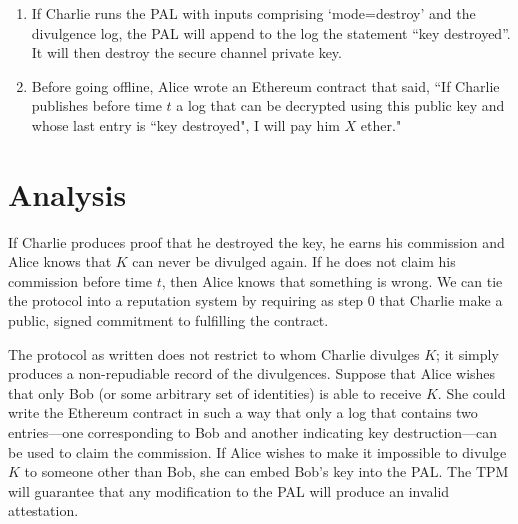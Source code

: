 \documentclass{article}
\begin{document}
\begin{enumerate}
\item If Charlie runs the PAL with inputs comprising `mode=destroy' and the divulgence log, the PAL will append to the log the statement ``key destroyed''. It will then destroy the secure channel private key.

\item Before going offline, Alice wrote an Ethereum contract that said, ``If Charlie publishes before time $t$ a log that can be decrypted using this public key and whose last entry is ``key destroyed", I will pay him $X$ ether."

\end{enumerate}

\section{Analysis}

If Charlie produces proof that he destroyed the key, he earns his commission and Alice knows that $K$ can never be divulged again. If he does not claim his commission before time $t$, then Alice knows that something is wrong. We can tie the protocol into a reputation system by requiring as step 0 that Charlie make a public, signed commitment to fulfilling the contract.

The protocol as written does not restrict to whom Charlie divulges $K$; it simply produces a non-repudiable record of the divulgences. Suppose that Alice wishes that only Bob (or some arbitrary set of identities) is able to receive $K$. She could write the Ethereum contract in such a way that only a log that contains two entries---one corresponding to Bob and another indicating key destruction---can be used to claim the commission. If Alice wishes to make it impossible to divulge $K$ to someone other than Bob, she can embed Bob's key into the PAL. The TPM will guarantee that any modification to the PAL will produce an invalid attestation.
\end{document}
